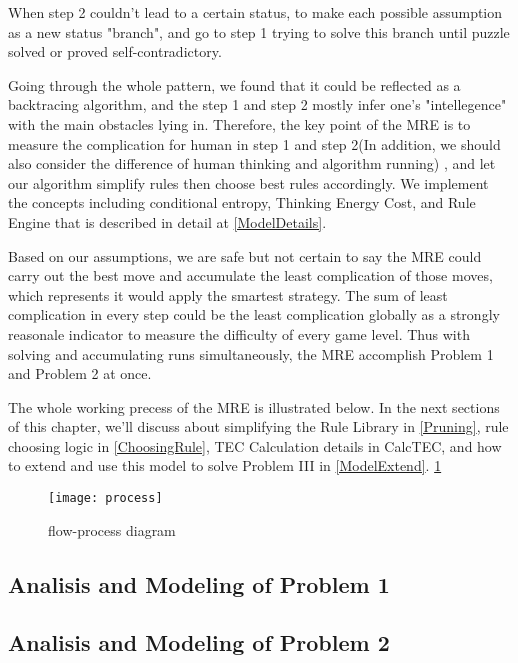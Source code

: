 \documentclass[12pt,a4paper,]{article}
\begin{document}
When step 2 couldn't lead to a certain status, to make each possible assumption as a new status "branch", and go to step 1 trying to solve this branch until puzzle solved or proved self-contradictory. 

Going through the whole pattern, we found that it could be reflected as a backtracing algorithm, and the step 1 and step 2 mostly infer one's "intellegence" with the main obstacles lying in. Therefore, the key point of the MRE is to measure the complication for human in step 1 and step 2(In addition, we should also consider the difference of human thinking and algorithm running) , and let our algorithm simplify rules then choose best rules accordingly. We implement the concepts including conditional entropy, Thinking Energy Cost, and Rule Engine that is described in detail at \ref{ModelDetails}. 

Based on our assumptions, we are safe but not certain to say the MRE could carry out the best move and accumulate the least complication of those moves, which represents it would apply the smartest strategy. The sum of least complication in every step could be the least complication globally as a strongly reasonale indicator to measure the difficulty of every game level. Thus with solving and accumulating runs simultaneously, the MRE accomplish Problem 1 and Problem 2 at once. 

The whole working precess of the MRE is illustrated below. In the next sections of this chapter, we'll discuss about simplifying the Rule Library in \ref{Pruning}, rule choosing logic in \ref{ChoosingRule}, TEC Calculation details in {CalcTEC}, and how to extend and use this model to solve Problem III in \ref{ModelExtend}.
\ref{fig:flow-process diagram}
\begin{figure}[htb]
	\centering 
	\texttt{[image: process]}
	\caption{flow-process diagram} 
	\label{fig:flow-process diagram} 
\end{figure}

\subsection{Analisis and Modeling of Problem 1}

\subsection{Analisis and Modeling of Problem 2}
\end{document}
